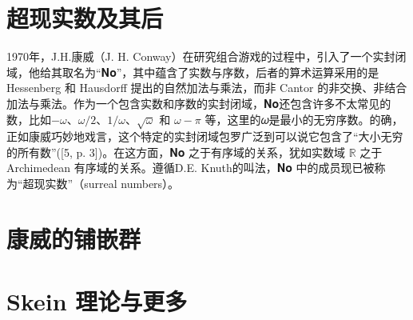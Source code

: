 \documentclass[a4paper,12pt]{article}
\numberwithin{problem}{section}
\numberwithin{definition}{section}
\numberwithin{lemma}{section}
\numberwithin{proposition}{section}
\numberwithin{theorem}{section}
\numberwithin{grammar}{section}
\numberwithin{program}{section}
\numberwithin{convention}{section}
\numberwithin{corollary}{section}
\begin{document}
\section{超现实数及其后}

1970年，J.H.康威（J. H. Conway）在研究组合游戏的过程中，引入了一个实封闭域，他给其取名为“𝐍𝐨”，其中蕴含了实数与序数，后者的算术运算采用的是 Hessenberg 和 Hausdorff 提出的自然加法与乘法，而非 Cantor 的非交换、非结合加法与乘法。作为一个包含实数和序数的实封闭域，𝐍𝐨还包含许多不太常见的数，比如$-𝜔$、$𝜔/2$、$1/𝜔$、$\sqrt{𝜔}$ 和 $𝜔 − 𝜋$ 等，这里的𝜔是最小的无穷序数。的确，正如康威巧妙地戏言，这个特定的实封闭域包罗广泛到可以说它包含了“大小无穷的所有数”([5, p. 3])。在这方面，𝐍𝐨 之于有序域的关系，犹如实数域 $\mathbb{R}$ 之于 Archimedean 有序域的关系。遵循D.E. Knuth的叫法，𝐍𝐨 中的成员现已被称为“超现实数”（surreal numbers）。


\section{康威的铺嵌群}

\section{Skein 理论与更多}
\end{document}
